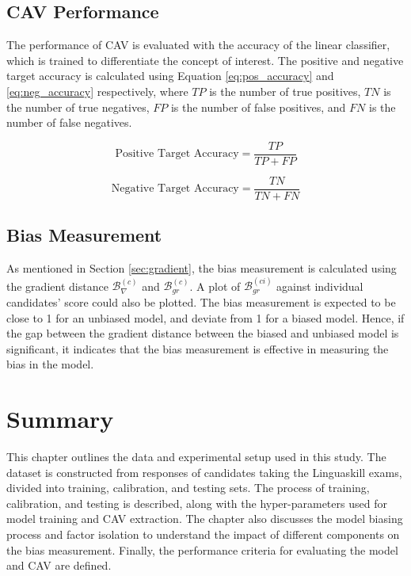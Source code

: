 \subsection{CAV Performance}
The performance of CAV is evaluated with the accuracy of the linear classifier, which is trained to differentiate the concept of interest. The positive and negative target accuracy is calculated using Equation \ref{eq:pos_accuracy} and \ref{eq:neg_accuracy} respectively, where $TP$ is the number of true positives, $TN$ is the number of true negatives, $FP$ is the number of false positives, and $FN$ is the number of false negatives.

\begin{equation} \label{eq:pos_accuracy}
  \text{Positive Target Accuracy} = \frac{TP}{TP + FP}
\end{equation}

\begin{equation} \label{eq:neg_accuracy}
  \text{Negative Target Accuracy} = \frac{TN}{TN + FN}
\end{equation}

\subsection{Bias Measurement}
As mentioned in Section \ref{sec:gradient}, the bias measurement is calculated using the gradient distance $\mathcal{B}^{(c)}_{\nabla}$ and $\mathcal{B}^{(c)}_{gr}$. A plot of $\mathcal{B}^{(ci)}_{gr}$ against individual candidates' score could also be plotted. The bias measurement is expected to be close to 1 for an unbiased model, and deviate from 1 for a biased model. Hence, if the gap between the gradient distance between the biased and unbiased model is significant, it indicates that the bias measurement is effective in measuring the bias in the model.

\section{Summary}
This chapter outlines the data and experimental setup used in this study. The dataset is constructed from responses of candidates taking the Linguaskill exams, divided into training, calibration, and testing sets. The process of training, calibration, and testing is described, along with the hyper-parameters used for model training and CAV extraction. The chapter also discusses the model biasing process and factor isolation to understand the impact of different components on the bias measurement. Finally, the performance criteria for evaluating the model and CAV are defined.